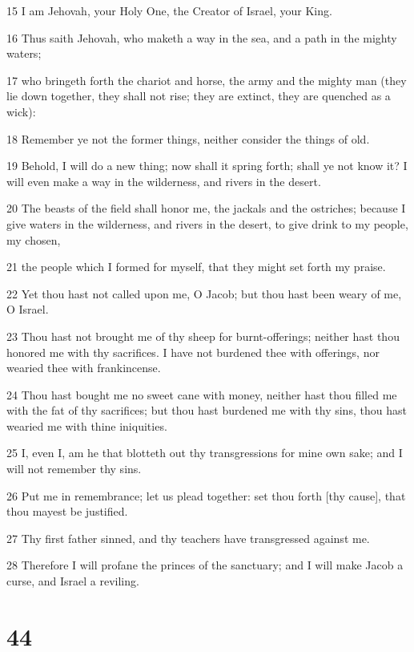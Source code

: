 \par 15 I am Jehovah, your Holy One, the Creator of Israel, your King.
\par 16 Thus saith Jehovah, who maketh a way in the sea, and a path in the mighty waters;
\par 17 who bringeth forth the chariot and horse, the army and the mighty man (they lie down together, they shall not rise; they are extinct, they are quenched as a wick):
\par 18 Remember ye not the former things, neither consider the things of old.
\par 19 Behold, I will do a new thing; now shall it spring forth; shall ye not know it? I will even make a way in the wilderness, and rivers in the desert.
\par 20 The beasts of the field shall honor me, the jackals and the ostriches; because I give waters in the wilderness, and rivers in the desert, to give drink to my people, my chosen,
\par 21 the people which I formed for myself, that they might set forth my praise.
\par 22 Yet thou hast not called upon me, O Jacob; but thou hast been weary of me, O Israel.
\par 23 Thou hast not brought me of thy sheep for burnt-offerings; neither hast thou honored me with thy sacrifices. I have not burdened thee with offerings, nor wearied thee with frankincense.
\par 24 Thou hast bought me no sweet cane with money, neither hast thou filled me with the fat of thy sacrifices; but thou hast burdened me with thy sins, thou hast wearied me with thine iniquities.
\par 25 I, even I, am he that blotteth out thy transgressions for mine own sake; and I will not remember thy sins.
\par 26 Put me in remembrance; let us plead together: set thou forth [thy cause], that thou mayest be justified.
\par 27 Thy first father sinned, and thy teachers have transgressed against me.
\par 28 Therefore I will profane the princes of the sanctuary; and I will make Jacob a curse, and Israel a reviling.

\chapter{44}

